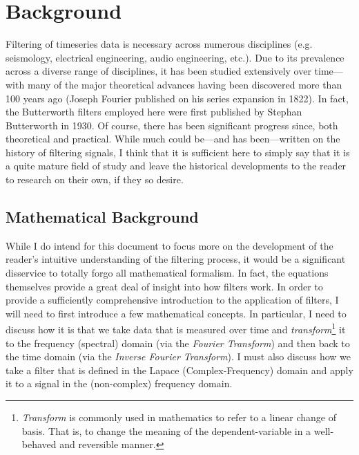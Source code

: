 \documentclass[american, twoside]{article}
\begin{document}
\section{Background} \label{Background}
Filtering of timeseries data is necessary across numerous disciplines (e.g. seismology, electrical engineering, audio engineering, etc.). Due to its prevalence
across a diverse range of disciplines, it has been studied extensively over time---with many of the major theoretical advances having been discovered
more than 100 years ago (Joseph Fourier published on his series expansion in 1822\autocite{fourier1822theorie}). In fact, the Butterworth filters employed here were first published
by Stephan Butterworth in 1930\autocite{butterworth1930theory}. Of course, there has been significant progress since, both theoretical and practical. While much could be---and has been---written
on the history of filtering signals, I think that it is sufficient here to simply say that it is a quite mature field of study and leave the historical developments
to the reader to research on their own, if they so desire.

\subsection{Mathematical Background} \label{Background:Math}
While I do intend for this document to focus more on the development of the reader's intuitive understanding of the filtering process, it would be a significant
disservice to totally forgo all mathematical formalism. In fact, the equations themselves provide a great deal of insight into how filters work.
In order to provide a sufficiently comprehensive introduction to the application of filters, I will need to first introduce a few mathematical concepts. In particular,
I need to discuss how it is that we take data that is measured over time and \textit{transform}\footnote{\textit{Transform} is commonly used in mathematics to refer to
a linear change of basis. That is, to change the meaning of the dependent-variable in a well-behaved and reversible manner.} it to the frequency (spectral) domain (via the \textit{Fourier Transform})
and then back to the time domain (via the \textit{Inverse Fourier Transform}). I must also discuss how we take a filter that is defined in the Lapace (Complex-Frequency)
domain and apply it to a signal in the (non-complex) frequency domain.
\end{document}
